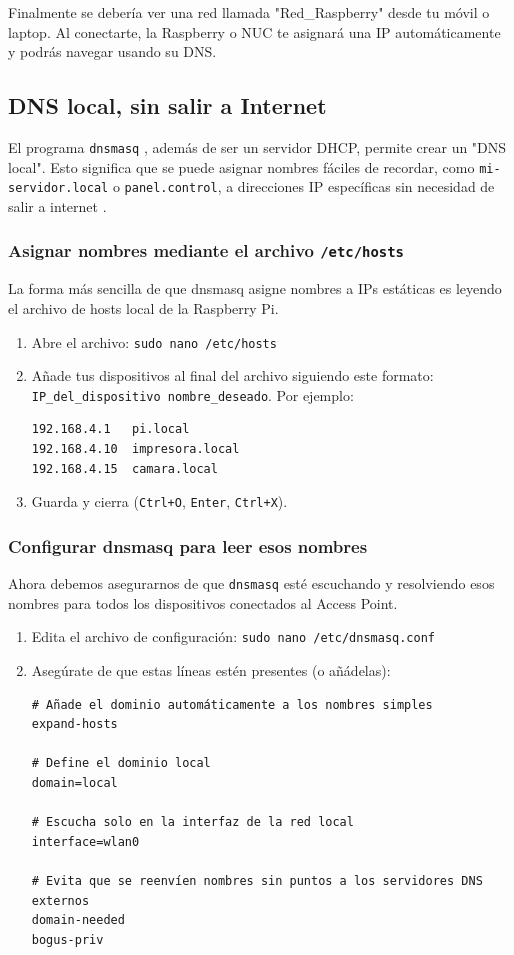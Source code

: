 Finalmente se debería ver una red llamada "Red\_Raspberry" desde tu
móvil o laptop. Al conectarte, la Raspberry o NUC te asignará una
IP automáticamente y podrás navegar usando su DNS.


\subsection{DNS local, sin salir a Internet}

El programa \texttt{dnsmasq} \cite{kelley_dnsmasq_2024},
además de ser un servidor DHCP,
permite crear un "DNS local".  Esto significa que se puede asignar
nombres fáciles de recordar, como \texttt{mi-servidor.local} o
\texttt{panel.control}, a direcciones IP específicas sin necesidad
de salir a internet \cite{raspberrypi_forums}.


\subsubsection{Asignar nombres mediante el archivo \texttt{/etc/hosts}}

La forma más sencilla de que dnsmasq asigne nombres a IPs estáticas es
leyendo el archivo de hosts local de la Raspberry Pi.

\begin{enumerate}
	\item Abre el archivo: \texttt{sudo nano /etc/hosts}
	\item Añade tus dispositivos al final del archivo siguiendo este
		formato: \texttt{IP\_del\_dispositivo  nombre\_deseado}. Por ejemplo:
\begin{lstlisting}
192.168.4.1   pi.local
192.168.4.10  impresora.local
192.168.4.15  camara.local
\end{lstlisting}
	\item Guarda y cierra (\texttt{Ctrl+O}, \texttt{Enter}, \texttt{Ctrl+X}).
\end{enumerate}

\subsubsection{Configurar dnsmasq para leer esos nombres}

Ahora debemos asegurarnos de que \texttt{dnsmasq} esté escuchando
y resolviendo esos nombres para todos los dispositivos conectados
al Access Point.

\begin{enumerate}
	\item Edita el archivo de configuración: \texttt{sudo nano /etc/dnsmasq.conf}
	\item Asegúrate de que estas líneas estén presentes (o añádelas):
\begin{lstlisting}
# Añade el dominio automáticamente a los nombres simples
expand-hosts

# Define el dominio local
domain=local

# Escucha solo en la interfaz de la red local
interface=wlan0

# Evita que se reenvíen nombres sin puntos a los servidores DNS externos
domain-needed
bogus-priv
\end{lstlisting}
\end{enumerate}

